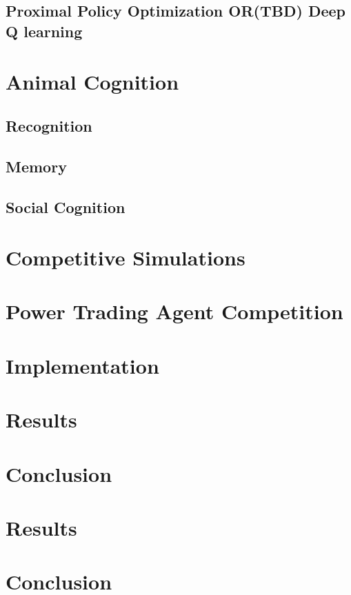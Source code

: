\section{Proximal Policy Optimization OR(TBD) Deep Q learning}

\chapter{Animal Cognition}
\section{Recognition}
\section{Memory}
\section{Social Cognition}

\chapter{Competitive Simulations}%

\chapter{Power Trading Agent Competition}


\chapter{Implementation}


\chapter{Results}
\chapter{Conclusion}










\chapter{Results}

\chapter{Conclusion}
